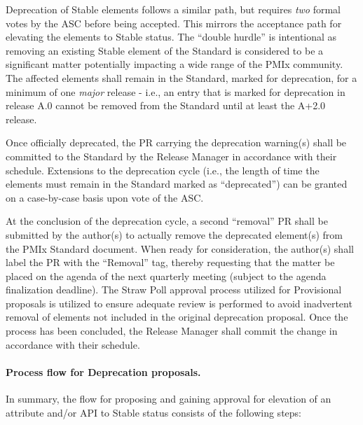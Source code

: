 \documentclass{article}
\begin{document}
Deprecation of Stable elements follows a similar path, but requires
\emph{two} formal votes by the ASC before being accepted. This mirrors
the acceptance path for elevating the elements to Stable status. The
``double hurdle'' is intentional as removing an existing Stable
element of the Standard is considered to be a significant matter
potentially impacting a wide range of the PMIx community. The affected
elements shall remain in the Standard, marked for deprecation, for a
minimum of one \emph{major} release - i.e., an entry that is marked for
deprecation in release A.0 cannot be removed from the Standard until at
least the A+2.0 release.

Once officially deprecated, the PR carrying the deprecation warning(s)
shall be committed to the Standard by the Release Manager in accordance
with their schedule. Extensions to the deprecation cycle (i.e., the
length of time the elements must remain in the Standard marked as
``deprecated'') can be granted on a case-by-case basis upon vote of the
ASC.

At the conclusion of the deprecation cycle, a second ``removal'' PR
shall be submitted by the author(s) to actually remove the deprecated
element(s) from the PMIx Standard document. When ready for
consideration, the author(s) shall label the PR with the ``Removal''
tag, thereby requesting that the matter be placed on the agenda of the
next quarterly meeting (subject to the agenda finalization deadline). The Straw
Poll approval process utilized for Provisional proposals is
utilized to ensure adequate review is performed to avoid inadvertent
removal of elements not included in the original deprecation proposal.
Once the process has been concluded, the Release Manager shall commit
the change in accordance with their schedule.

\hypertarget{process-flow-for-deprecation-proposals}{%
\paragraph{Process flow for Deprecation
proposals.}\label{process-flow-for-deprecation-proposals}}

In summary, the flow for proposing and gaining approval for elevation of
an attribute and/or API to Stable status consists of the following
steps:
\end{document}
